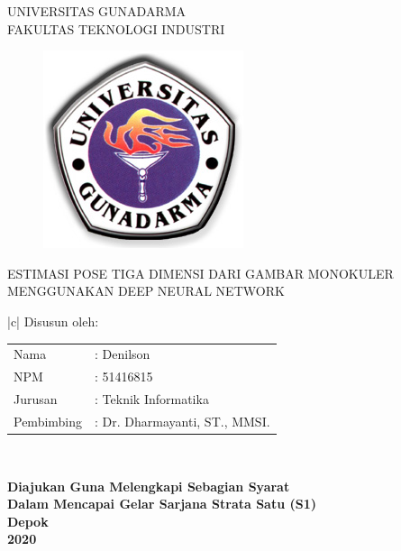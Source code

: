 \newpage


\begin{center}

\bfseries

{\Large UNIVERSITAS GUNADARMA}\\
{\Large FAKULTAS TEKNOLOGI INDUSTRI}\\

\vspace{1.0cm}

\begin{figure}[h]
  \begin{center}
    \includegraphics[scale=4.5]{gambar/LogoGunadarma.jpg}
  \end{center}
\end{figure}

{\large ESTIMASI POSE TIGA DIMENSI DARI GAMBAR MONOKULER MENGGUNAKAN DEEP NEURAL NETWORK}

\vspace{1.5cm}

\begin{tabular}{|c|}
  \hline
  Disusun oleh: \\
  \begin{tabular}{ll}
  Nama& : Denilson \\[-5pt]
  NPM& : 51416815 \\[-5pt]
  Jurusan& : Teknik Informatika \\[-5pt]
  Pembimbing& : Dr. Dharmayanti, ST., MMSI.\\
  \end{tabular}\\
  \hline
\end{tabular}

\end{center}

\vspace{1.5cm}

\begin{center}
\bfseries
Diajukan Guna Melengkapi Sebagian Syarat \\
Dalam Mencapai Gelar Sarjana Strata Satu (S1)\\

Depok\\
2020 %
\end{center}
